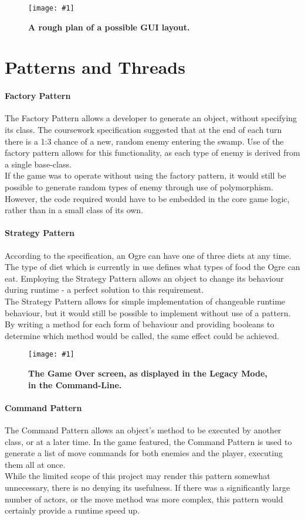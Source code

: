 \documentclass[conference]{acmsiggraph}
\newcommand{\figuremacroW}[4]{
	\begin{figure}[h] %
		\centering
		\texttt{[image: \#1]}
		\caption[#2]{\textbf{#2}  #3}
		\label{fig:#1}
	\end{figure}
}
\newcommand{\figuremacroF}[4]{
	\begin{figure*}[t] %
		\centering
		\texttt{[image: \#1]}
		\caption[#2]{\textbf{#2}  #3}
		\label{fig:#1}
	\end{figure*}
}
\begin{document}
		
		\figuremacroW
		{planning}
		{A rough plan of a possible GUI layout.}
		{}
		{0.75}	
		
	\section{Patterns and Threads}
	
		\paragraph{Factory Pattern}
		 	The Factory Pattern allows a developer to generate an object, without specifying its class.
		 	The coursework specification suggested that at the end of each turn there is a 1:3 chance of a new, random enemy entering the swamp. Use of the factory pattern allows for this functionality, as each type of enemy is derived from a single base-class.\\
		 	If the game was to operate without using the factory pattern, it would still be possible to generate random types of enemy through use of polymorphism. However, the code required would have to be embedded in the core game logic, rather than in a small class of its own.
		 	
 	
 		\paragraph{Strategy Pattern}
		 	According to the specification, an Ogre can have one of three diets at any time. The type of diet which is currently in use defines what types of food the Ogre can eat. Employing the Strategy Pattern allows an object to change its behaviour during runtime - a perfect solution to this requirement.\\
		 	The Strategy Pattern allows for simple implementation of changeable runtime behaviour, but it would still be possible to implement without use of a pattern. By writing a method for each form of behaviour and providing booleans to determine which method would be called, the same effect could be achieved.
 	
		\figuremacroF
		{textScreen2}
		{The Game Over screen, as displayed in the Legacy Mode, in the Command-Line.}
		{}
		{0.75}
 	
 		\paragraph{Command Pattern}
	 		The Command Pattern allows an object’s method to be executed by another class, or at a later time. In the game featured, the Command Pattern is used to generate a list of move commands for both enemies and the player, executing them all at once.\\
	 		While the limited scope of this project may render this pattern somewhat unnecessary, there is no denying its usefulness. If there was a significantly large number of actors, or the move method was more complex, this pattern would certainly provide a runtime speed up.
	 		
\end{document}
